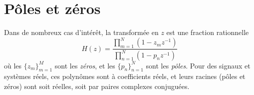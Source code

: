 %
%
%
%
%
%
\section{Pôles et zéros}
Dans de nombreux cas d'intérêt, la transformée en $z$ est une fraction rationnelle
\begin{equation}
\label{eq:transformee-z-generale}
H(z)= \frac{\prod_{m=1}^N (1 -z_m z^{-1})}{\prod_{n=1}^N (1 - p_n z^{-1})}
\end{equation}
o\`{u} les $\{ z_{m} \}_{m=1}^M$ sont les \emph{z\'{e}ros}, et les $\{ p_{n} \}_{n=1}^N$ sont les \emph{p\^{o}les}.
Pour des signaux et systèmes r\'{e}els, ces polyn\^{o}mes sont \`{a} coefficients r\'{e}els, et leurs racines (p\^{o}les et z\'{e}ros) sont soit r\'{e}elles, soit par paires complexes conjugu\'{e}es.

